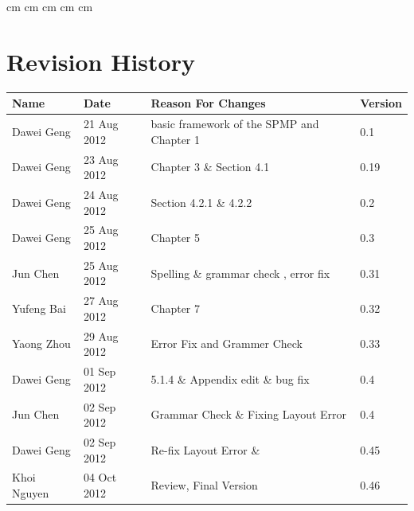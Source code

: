 \documentclass[11pt, a4paper]{report}
\begin{document}
 cm
 cm
 cm
 cm
 cm

\tableofcontents






\clearpage
\section*{Revision History}
\begin{tabular}{| l | l | l | l | }
\hline
Name      		&	Date        	&	Reason For Changes								&	Version			\\ \hline
Dawei Geng      &	21 Aug 2012    	&	basic framework of the SPMP and Chapter 1		&	0.1				\\ \hline
Dawei Geng      &	23 Aug 2012    	&	Chapter 3 \& Section 4.1						&	0.19			\\ \hline
Dawei Geng      &	24 Aug 2012     &	Section 4.2.1 \& 4.2.2							&	0.2				\\ \hline
Dawei Geng     	&	25 Aug 2012     &	Chapter 5										&	0.3				\\ \hline
Jun Chen		&	25 Aug 2012		&	Spelling \& grammar check , error fix			&	0.31			\\ \hline
Yufeng Bai      &	27 Aug 2012		&	Chapter 7										&	0.32			\\ \hline
Yaong Zhou		&	29 Aug 2012		&	Error Fix and Grammer Check						&	0.33			\\ \hline
Dawei Geng      &	01 Sep 2012     &	5.1.4 \& Appendix edit \& bug fix				&	0.4				\\ \hline
Jun Chen     	&	02 Sep 2012     &   Grammar Check \& Fixing Layout Error			&	0.4				\\ \hline
Dawei Geng     	&	02 Sep 2012     &	Re-fix Layout Error	\&  						&	0.45			\\ \hline
Khoi Nguyen		&	04 Oct 2012		&	Review, Final Version							&	0.46





\end{tabular}
\clearpage
\end{document}
